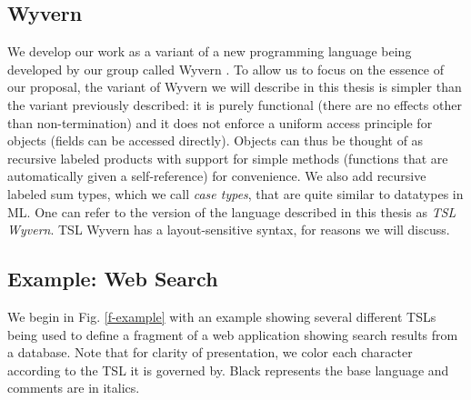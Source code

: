 \subsection{Wyvern}
We develop our work as a variant of a new programming language being developed by our group called Wyvern \cite{Nistor:2013:WST:2489828.2489830}. To allow us to focus on the essence of our proposal, the variant of Wyvern we will describe in this thesis is simpler than the variant previously described: it is purely functional (there are no effects other than non-termination) and it does not enforce a uniform access principle for objects (fields can be accessed directly). Objects can thus be thought of as recursive labeled products with support for simple methods (functions that are automatically given a self-reference) for convenience. We also add recursive labeled sum types, which we call \emph{case types}, that are quite similar to datatypes in ML. One can refer to the version of the language described in this thesis as \emph{TSL Wyvern}. TSL Wyvern has a layout-sensitive syntax, for reasons we will discuss.

\subsection{Example: Web Search}
We begin in Fig. \ref{f-example} with an example showing several different TSLs being used to define a fragment of a web application showing search results from a database. Note that for clarity of presentation, we color each character  according to the TSL it is governed by. Black represents the base language and comments are in italics.

